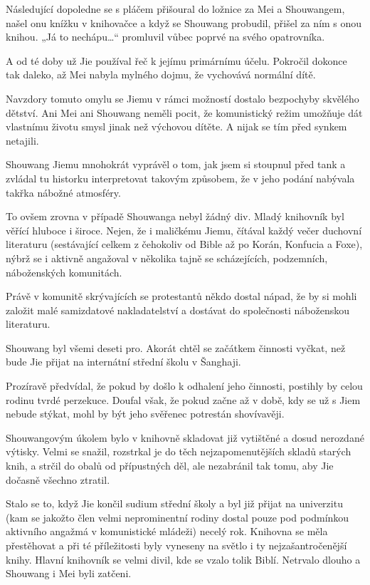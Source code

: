 Následující dopoledne se s pláčem přišoural do ložnice za Mei a Shouwangem, našel onu knížku v knihovačce a když se Shouwang probudil, přišel za ním s onou knihou. „Já to nechápu…“ promluvil vůbec poprvé na svého opatrovníka.

A od té doby už Jie používal řeč k jejímu primárnímu účelu.  Pokročil dokonce tak daleko, až Mei nabyla mylného dojmu, že vychovává normální dítě. 

Navzdory tomuto omylu se Jiemu v rámci možností dostalo bezpochyby skvělého dětství. Ani Mei ani Shouwang neměli pocit, že komunistický režim umožňuje dát vlastnímu životu smysl jinak než výchovou dítěte. A nijak se tím před synkem netajili.

Shouwang Jiemu mnohokrát vyprávěl o tom, jak jsem si stoupnul před tank a zvládal tu historku interpretovat takovým způsobem, že v jeho podání nabývala takřka nábožné atmosféry.

To ovšem zrovna v případě Shouwanga nebyl žádný div. Mladý knihovník byl věřící hluboce i široce. Nejen, že i maličkému  Jiemu, čítával každý večer duchovní literaturu (sestávající celkem z čehokoliv od Bible až po Korán, Konfucia a Foxe), nýbrž se i aktivně angažoval v několika tajně se scházejících, podzemních, náboženských komunitách.

Právě v komunitě skrývajících se protestantů někdo dostal nápad, že by si mohli založit malé samizdatové nakladatelství a dostávat do společnosti náboženskou literaturu.

Shouwang byl všemi deseti pro. Akorát chtěl se začátkem činnosti vyčkat, než bude Jie přijat na internátní střední školu v Šanghaji.  

Prozíravě předvídal, že pokud by došlo k odhalení jeho činnosti, postihly by celou rodinu tvrdé perzekuce. Doufal však, že pokud začne až v době, kdy se už s Jiem nebude stýkat, mohl by být jeho svěřenec potrestán shovívavěji.

Shouwangovým úkolem bylo v knihovně skladovat již vytištěné a dosud nerozdané výtisky. Velmi se snažil, rozstrkal je do těch nejzapomenutějších skladů starých knih, a strčil do obalů od přípustných děl, ale nezabránil tak tomu, aby Jie dočasně všechno ztratil.

Stalo se to, když Jie končil sudium střední školy a byl již přijat na univerzitu (kam se jakožto člen velmi neprominentní rodiny dostal pouze pod podmínkou aktivního angažmá v komunistické mládeži) necelý rok.  Knihovna se měla přestěhovat a při té příležitosti byly vyneseny na světlo i ty nejzašantročenější knihy. Hlavní knihovník se velmi divil, kde se vzalo tolik Biblí. Netrvalo dlouho a Shouwang i Mei byli zatčeni.

